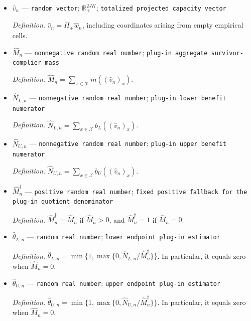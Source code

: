 \documentclass{article}
\begin{document}
\begin{itemize}
  \par\smallskip\noindent\emph{Definition.} \((\widehat w_n)_x=\widehat p_{n,x}(\widehat\ell_{n,x,0},\ldots,\widehat\ell_{n,x,K-1},\widehat h_{n,x,0},\ldots,\widehat h_{n,x,K-1})^{\prime}\), stacked over \(x\in\mathcal X\). This formula is used without screening on every finite sample.
  \item \(\widehat v_n\) --- \texttt{random vector}; \(\mathbb R_+^{2JK}\); \texttt{totalized projected capacity vector}
  \par\smallskip\noindent\emph{Definition.} \(\widehat v_n=\Pi_+\widehat w_n\), including coordinates arising from empty empirical cells.
  \item \(\widehat M_n\) --- \texttt{nonnegative random real number}; \texttt{plug-\allowbreak{}in aggregate survivor-\allowbreak{}complier mass}
  \par\smallskip\noindent\emph{Definition.} \(\widehat M_n=\sum_{x\in\mathcal X}m((\widehat v_n)_x)\).
  \item \(\widehat N_{L,n}\) --- \texttt{nonnegative random real number}; \texttt{plug-\allowbreak{}in lower benefit numerator}
  \par\smallskip\noindent\emph{Definition.} \(\widehat N_{L,n}=\sum_{x\in\mathcal X}b_L((\widehat v_n)_x)\).
  \item \(\widehat N_{U,n}\) --- \texttt{nonnegative random real number}; \texttt{plug-\allowbreak{}in upper benefit numerator}
  \par\smallskip\noindent\emph{Definition.} \(\widehat N_{U,n}=\sum_{x\in\mathcal X}b_U((\widehat v_n)_x)\).
  \item \(\widehat M_n^{\dagger}\) --- \texttt{positive random real number}; \texttt{fixed positive fallback for the plug-\allowbreak{}in quotient denominator}
  \par\smallskip\noindent\emph{Definition.} \(\widehat M_n^{\dagger}=\widehat M_n\) if \(\widehat M_n>0\), and \(\widehat M_n^{\dagger}=1\) if \(\widehat M_n=0\).
  \item \(\widehat\theta_{L,n}\) --- \texttt{random real number}; \texttt{lower endpoint plug-\allowbreak{}in estimator}
  \par\smallskip\noindent\emph{Definition.} \(\widehat\theta_{L,n}=\min\{1,\max\{0,\widehat N_{L,n}/\widehat M_n^{\dagger}\}\}\). In particular, it equals zero when \(\widehat M_n=0\).
  \item \(\widehat\theta_{U,n}\) --- \texttt{random real number}; \texttt{upper endpoint plug-\allowbreak{}in estimator}
  \par\smallskip\noindent\emph{Definition.} \(\widehat\theta_{U,n}=\min\{1,\max\{0,\widehat N_{U,n}/\widehat M_n^{\dagger}\}\}\). In particular, it equals zero when \(\widehat M_n=0\).

\end{itemize}
\end{document}
